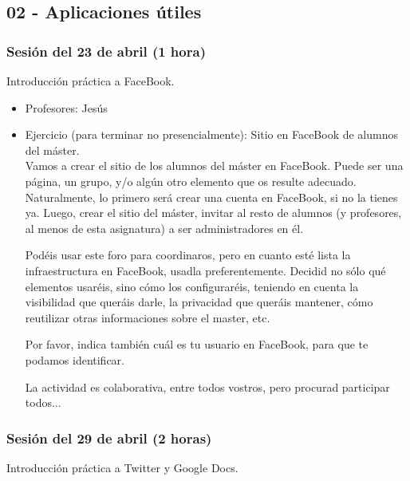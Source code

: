 \documentclass[a4paper,12pt]{article}
\begin{document}
\subsection{02 - Aplicaciones útiles}

\subsubsection{Sesión del 23 de abril (1 hora)}

Introducción práctica a FaceBook.

\begin{itemize}
\item Profesores: Jesús
\item Ejercicio (para terminar no presencialmente): Sitio en FaceBook de alumnos del máster. \\
  Vamos a crear el sitio de los alumnos del máster en FaceBook. Puede ser una página, un grupo, y/o algún otro elemento que os resulte adecuado. Naturalmente, lo primero será crear una cuenta en FaceBook, si no la tienes ya. Luego, crear el sitio del máster, invitar al resto de alumnos (y profesores, al menos de esta asignatura) a ser administradores en él.

Podéis usar este foro para coordinaros, pero en cuanto esté lista la infraestructura en FaceBook, usadla preferentemente. Decidid no sólo qué elementos usaréis, sino cómo los configuraréis, teniendo en cuenta la visibilidad que queráis darle, la privacidad que queráis mantener, cómo reutilizar otras informaciones sobre el master, etc.

Por favor, indica también cuál es tu usuario en FaceBook, para que te podamos identificar.

La actividad es colaborativa, entre todos vostros, pero procurad participar todos...
\end{itemize}

\subsubsection{Sesión del 29 de abril (2 horas)}

Introducción práctica a Twitter y Google Docs.
\end{document}
